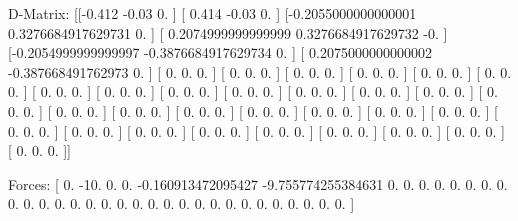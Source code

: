 D-Matrix:
[[-0.412              -0.03                0.                ]
 [ 0.414              -0.03                0.                ]
 [-0.2055000000000001  0.3276684917629731  0.                ]
 [ 0.2074999999999999  0.3276684917629732 -0.                ]
 [-0.2054999999999997 -0.3876684917629734  0.                ]
 [ 0.2075000000000002 -0.387668491762973   0.                ]
 [ 0.                  0.                  0.                ]
 [ 0.                  0.                  0.                ]
 [ 0.                  0.                  0.                ]
 [ 0.                  0.                  0.                ]
 [ 0.                  0.                  0.                ]
 [ 0.                  0.                  0.                ]
 [ 0.                  0.                  0.                ]
 [ 0.                  0.                  0.                ]
 [ 0.                  0.                  0.                ]
 [ 0.                  0.                  0.                ]
 [ 0.                  0.                  0.                ]
 [ 0.                  0.                  0.                ]
 [ 0.                  0.                  0.                ]
 [ 0.                  0.                  0.                ]
 [ 0.                  0.                  0.                ]
 [ 0.                  0.                  0.                ]
 [ 0.                  0.                  0.                ]
 [ 0.                  0.                  0.                ]
 [ 0.                  0.                  0.                ]
 [ 0.                  0.                  0.                ]
 [ 0.                  0.                  0.                ]
 [ 0.                  0.                  0.                ]
 [ 0.                  0.                  0.                ]
 [ 0.                  0.                  0.                ]
 [ 0.                  0.                  0.                ]
 [ 0.                  0.                  0.                ]
 [ 0.                  0.                  0.                ]
 [ 0.                  0.                  0.                ]
 [ 0.                  0.                  0.                ]
 [ 0.                  0.                  0.                ]]

Forces:
[  0.                -10.                  0.
   0.                 -0.160913472095427  -9.755774255384631
   0.                  0.                  0.
   0.                  0.                  0.
   0.                  0.                  0.
   0.                  0.                  0.
   0.                  0.                  0.
   0.                  0.                  0.
   0.                  0.                  0.
   0.                  0.                  0.
   0.                  0.                  0.
   0.                  0.                  0.               ]

